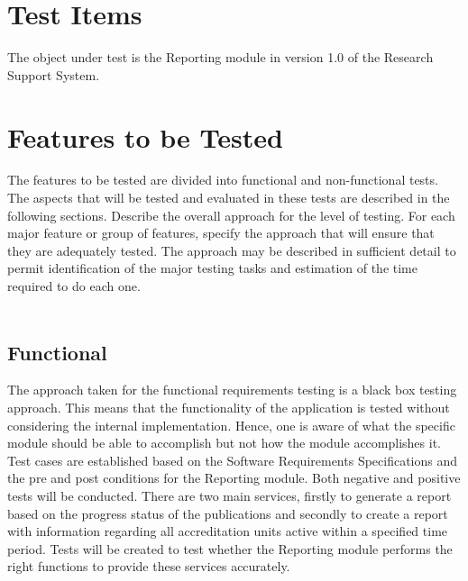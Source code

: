 %
% 	
%  	
% 
% 	
%

\section{Test Items}
The object under test is the Reporting module in version 1.0 of the Research Support System.

\section{Features to be Tested}

The features to be tested are divided into functional and non-functional tests. The aspects that will be tested and evaluated in these tests are described in the following sections. 
Describe the overall approach for the level of testing. For each major feature or group of features,
specify the approach that will ensure that they are adequately tested. The approach may be described in
sufficient detail to permit identification of the major testing tasks and estimation of the time required to
do each one.\\\\ 

\subsection{Functional}
The approach taken for the functional requirements testing is a black box testing approach. This means that the functionality of the application is tested without considering the internal implementation. Hence, one is aware of what the specific module should be able to accomplish but not how the module accomplishes it. Test cases are established based on the Software Requirements Specifications and the pre and post conditions for the Reporting module. Both negative and positive tests will be conducted. There are two main services, firstly to generate a report based on the progress status of the publications and secondly to create a report with information regarding all accreditation units active within a specified time period. Tests will be created to test whether the Reporting module performs the right functions to provide these services accurately. 

